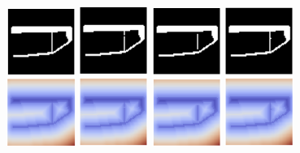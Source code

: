 \begin{figure}[htbp]
    \centering
    \includegraphics[width=0.2\textwidth]{./figures/TONIR/topo-a.png}
    \hspace{0.1cm}
    \includegraphics[width=0.2\textwidth]{./figures/TONIR/topo-b.png}
    \hspace{0.1cm}
    \includegraphics[width=0.2\textwidth]{./figures/TONIR/topo-c.png}
    \hspace{0.1cm}
    \includegraphics[width=0.2\textwidth]{./figures/TONIR/topo-d.png}

\end{figure}
